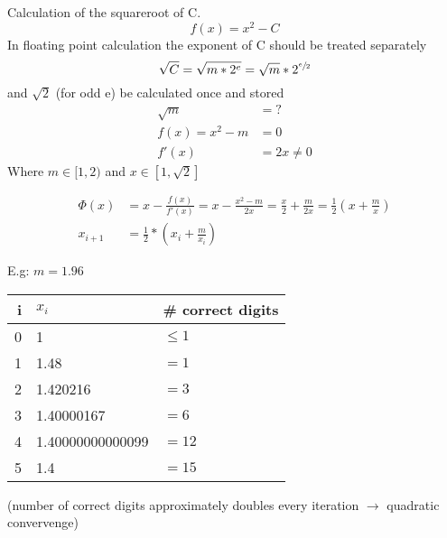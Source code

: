 \begin{example}
    Calculation of the squareroot of C\@.
    \begin{equation*}
        f(x)=x^2-C
    \end{equation*}
    In floating point calculation the exponent of C should be treated separately
    \begin{equation*}
        \sqrt {C} = \sqrt {m * 2^e} = \sqrt {m} * 2^{\sfrac{e}{2}}
    \end{equation*}
    and $\sqrt{2}$ (for odd e) be calculated once and stored
    \begin{align*}
        \sqrt {m} &= ? \\
        f(x) = x^2-m &= 0 \\
        f'(x) &= 2x \neq 0
    \end{align*}
    Where $m\in[1,2)$ and $x \in \left[1, \sqrt{2}\right]$

    \begin{align*}
        \Phi(x)&=x- \frac{f(x)}{f'(x)}= x- \frac{x^2-m}{2x}= \frac{x}{2}+ \frac{m}{2x} = \frac{1}{2} \left( x+ \frac{m}{x} \right)\\
        x_{i+1} &= \frac{1}{2}*\left(x_i+\frac{m}{x_i} \right)
    \end{align*}

    E.g: $m=1.96$
    \begin{center}
        \begin{tabular}{r l l}
            \toprule
            i & $x_i$              & \# correct digits \\
            \midrule
            0 & 1                & $\leq 1$          \\
            1 & 1.48             & $=1$              \\
            2 & 1.420216         & $=3$              \\
            3 & 1.40000167       & $=6$              \\
            4 & 1.40000000000099 & $=12$             \\
            5 & 1.4              & $=15$             \\
            \bottomrule
        \end{tabular}
    \end{center}
    (number of correct digits approximately doubles every iteration $\to$ quadratic convervenge)
\end{example}

